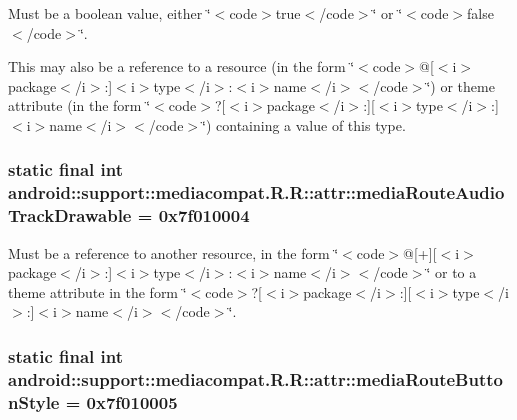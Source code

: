 Must be a boolean value, either \char`\"{}$<$code$>$true$<$/code$>$\char`\"{} or \char`\"{}$<$code$>$false$<$/code$>$\char`\"{}. 

This may also be a reference to a resource (in the form \char`\"{}$<$code$>$@\mbox{[}$<$i$>$package$<$/i$>$:\mbox{]}$<$i$>$type$<$/i$>$:$<$i$>$name$<$/i$>$$<$/code$>$\char`\"{}) or theme attribute (in the form \char`\"{}$<$code$>$?\mbox{[}$<$i$>$package$<$/i$>$:\mbox{]}\mbox{[}$<$i$>$type$<$/i$>$:\mbox{]}$<$i$>$name$<$/i$>$$<$/code$>$\char`\"{}) containing a value of this type. \hypertarget{classandroid_1_1support_1_1mediacompat_1_1_r_1_1attr_fab1b46895d235aa2129dc6bb024c4c1}{
\subsubsection[{mediaRouteAudioTrackDrawable}]{\setlength{\rightskip}{0pt plus 5cm}static final int android::support::mediacompat.R.R::attr::mediaRouteAudioTrackDrawable = 0x7f010004}}
\label{classandroid_1_1support_1_1mediacompat_1_1_r_1_1attr_fab1b46895d235aa2129dc6bb024c4c1}


Must be a reference to another resource, in the form \char`\"{}$<$code$>$@\mbox{[}+\mbox{]}\mbox{[}$<$i$>$package$<$/i$>$:\mbox{]}$<$i$>$type$<$/i$>$:$<$i$>$name$<$/i$>$$<$/code$>$\char`\"{} or to a theme attribute in the form \char`\"{}$<$code$>$?\mbox{[}$<$i$>$package$<$/i$>$:\mbox{]}\mbox{[}$<$i$>$type$<$/i$>$:\mbox{]}$<$i$>$name$<$/i$>$$<$/code$>$\char`\"{}. \hypertarget{classandroid_1_1support_1_1mediacompat_1_1_r_1_1attr_84c713fae18406c22f6aff287b9e8dc0}{
\subsubsection[{mediaRouteButtonStyle}]{\setlength{\rightskip}{0pt plus 5cm}static final int android::support::mediacompat.R.R::attr::mediaRouteButtonStyle = 0x7f010005}}
\label{classandroid_1_1support_1_1mediacompat_1_1_r_1_1attr_84c713fae18406c22f6aff287b9e8dc0}


